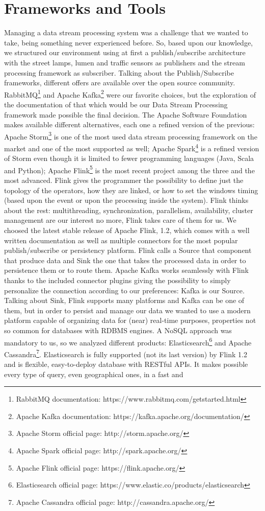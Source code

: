 \section{Frameworks and Tools}
Managing a data stream processing system was a challenge that we wanted to take, being something never experienced before. So, based upon our knowledge, we structured our environment using at first a publish/subscribe architecture with the street lamps, lumen and traffic sensors as publishers and the stream processing framework as subscriber. Talking about the Publish/Subscribe frameworks,  different offers are available over the open source community. RabbitMQ\footnote{RabbitMQ documentation: https://www.rabbitmq.com/getstarted.html} and Apache Kafka\footnote{Apache Kafka documentation: https://kafka.apache.org/documentation/} were our favorite choices, but the exploration of the documentation of that which would be our Data Stream Processing framework made possible the final decision. The Apache Software Foundation makes available different alternatives, each one a refined version of the previous: Apache Storm\footnote{Apache Storm official page: http://storm.apache.org/} is one of the most used data stream processing framework on the market and one of the most supported as well; Apache Spark\footnote{Apache Spark official page: http://spark.apache.org/} is a refined version of Storm even though it is limited to fewer programming languages (Java, Scala and Python); Apache Flink\footnote{Apache Flink official page: https://flink.apache.org/} is the most recent project among the three and the most advanced. Flink gives the programmer the possibility to define just the topology of the operators, how they are linked, or how to set the windows timing (based upon the event or upon the processing inside the system). Flink thinks about the rest: multithreading, synchronization, parallelism, availability, cluster management are our interest no more, Flink takes care of them for us. We choosed the latest stable release of Apache Flink, 1.2, which comes with a well written documentation as well as multiple connectors for the most popular publish/subscribe or persistency platform. Flink calls a Source that component that produce data and Sink the one that takes the processed data in order to persistence them or to route them. Apache Kafka works seamlessly with Flink thanks to the included connector plugins giving the possibility to simply personalize the connection according to our preferences: Kafka is our Source. Talking about Sink, Flink supports many platforms and Kafka can be one of them, but in order to persist and manage our data we wanted to use a modern platform capable of organizing data for (near) real-time purposes, properties not so common for databases with RDBMS engines. A NoSQL approach was mandatory to us, so we analyzed different products: Elasticsearch\footnote{Elasticsearch official page: https://www.elastic.co/products/elasticsearch} and Apache Cassandra\footnote{Apache Cassandra official page: http://cassandra.apache.org/}. Elasticsearch is fully supported (not its last version) by Flink 1.2 and is flexible, easy-to-deploy database with RESTful APIs. It makes possible every type of query, even geographical ones, in a fast and 